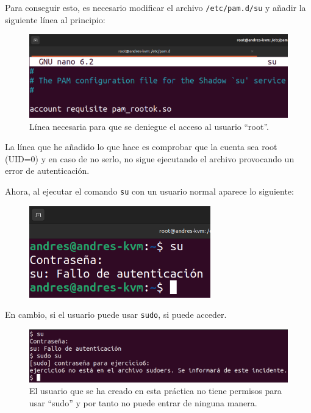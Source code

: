 \documentclass{article}
\begin{document}
\bigskip

Para conseguir esto, es necesario modificar el archivo \verb|/etc/pam.d/su| y añadir la siguiente línea al principio:

\begin{figure}[H]
    \includegraphics[width=\textwidth]{imagenes/sudeny.png}
    \caption{Línea necesaria para que se deniegue el acceso al usuario ``root''.}
\end{figure}

La línea que he añadido lo que hace es comprobar que la cuenta sea root (UID=0) y en caso de no serlo, no sigue ejecutando el archivo provocando un error de autenticación.

\bigskip

Ahora, al ejecutar el comando \verb|su| con un usuario normal aparece lo siguiente:

\begin{figure}[H]
    \centering
    \includegraphics[width=0.7\textwidth]{imagenes/sudenyuser.png}
\end{figure}

\bigskip

En cambio, si el usuario puede usar \verb|sudo|, si puede acceder.

\begin{figure}[H]
    \centering
    \includegraphics[width=\textwidth]{imagenes/sudenyuserprueba.png}
    \caption{El usuario que se ha creado en esta práctica no tiene permisos para usar ``sudo'' y por tanto no puede entrar de ninguna manera.}
\end{figure}
\end{document}
